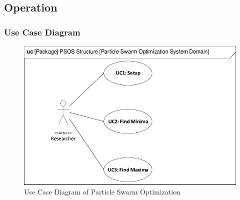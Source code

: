 \subsection{Operation}\label{requirementspecification:operation}
\blindtext


\subsubsection{Use Case Diagram} \label{requirementspecification:usecasediagrams}

\blindtext

\begin{figure}[H]
	\centering
	\includegraphics[width=0.8\linewidth]{diagram/uc_particle_swarm_optimization_system.pdf}
	\caption{Use Case Diagram of Particle Swarm Optimization}
	\label{fig:ucdiagram}
\end{figure}






